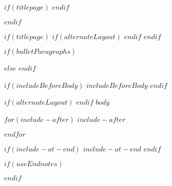\documentclass[$if(fontSize)$$fontSize$,%
	$if(language)$$language$,$else$english,$endif$%
	$if(paperSize)$$paperSize$,$else$ a4paper,%
	$endif$$if(classOptions)$$classOptions$,$endif$%
	$if(twoSided)$twoside,$endif$%
	$if(titlepage)$titlepage,$endif$%
	$if(centerEqs)$$else$fleqn$endif$]{$if(documentClass)$%
		$documentClass$$else$article$endif$}
\begin{document}
$if(titlepage)$
\newpage
$endif$


$endif$



$if(titlepage)$
    $if(alternateLayout)$
        \restoregeometry
    $endif$
$endif$

$if(bulletParagraphs)$
\let\oldep\everypar  \newtoks\everypar  \oldep{\the\everypar\hbox{\P}}

\makeatletter
\def\@sect#1#2#3#4#5#6[#7]#8{%
  \ifnum #2>\c@secnumdepth
    \let\@svsec\@empty
  \else
    \refstepcounter{#1}%
    \protected@edef\@svsec{\@seccntformat{#1}\relax}%
  \fi
  \@tempskipa #5\relax
  \ifdim \@tempskipa>\z@
    \begingroup
      #6{%
        \@hangfrom{\hskip #3\relax\@svsec}%
          \interlinepenalty \@M 
\leavevmode \setbox\z@\lastbox\setbox\tw@\lastbox\box\z@
#8\@@par}%
    \endgroup
    \csname #1mark\endcsname{#7}%
    \addcontentsline{toc}{#1}{%
      \ifnum #2>\c@secnumdepth \else
        \protect\numberline{\csname the#1\endcsname}%
      \fi
      #7}%
  \else
    \def\@svsechd{%
      #6{\hskip #3\relax
      \@svsec #8}%
      \csname #1mark\endcsname{#7}%
      \addcontentsline{toc}{#1}{%
        \ifnum #2>\c@secnumdepth \else
          \protect\numberline{\csname the#1\endcsname}%
        \fi
        #7}}%
  \fi
  \@xsect{#5}}

\makeatother
$else$
$endif$


$if(includeBeforeBody)$
    $includeBeforeBody$
$endif$

$if(alternateLayout)$
    \pagestyle{fancy}
$endif$
$body$

$for(include-after)$
$include-after$

$endfor$

$if(include-at-end)$
$include-at-end$
$endif$


$if(useEndnotes)$
\renewcommand{\notesname}{~}



\def\enotesize{\normalsize}
\theendnotes
$endif$
\end{document}
